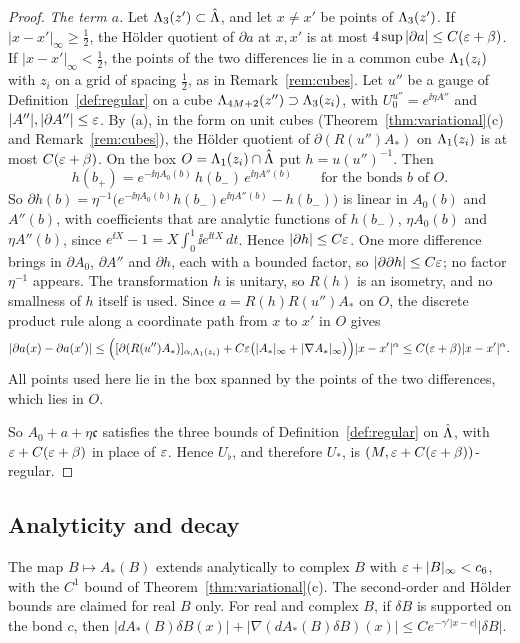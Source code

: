 \begin{proof}
\emph{The term $a$.} Let $\Lambda_3(z')\subset\hat{\Lambda}$, and let $x\ne x'$ be points of $\Lambda_3(z')$. If $|x-x'|_\infty\ge\frac12$, the H\"older quotient of $\partial a$ at $x,x'$ is at most $4\sup|\partial a|\le C(\varepsilon+\beta)$. If $|x-x'|_\infty<\frac12$, the points of the two differences lie in a common cube $\Lambda_1(z_i)$ with $z_i$ on a grid of spacing $\frac12$, as in Remark~\ref{rem:cubes}. Let $u''$ be a gauge of Definition~\ref{def:regular} on a cube $\Lambda_{4M+2}(z'')\supset\Lambda_3(z_i)$, with $U_0^{u''}=e^{\ii\eta A''}$ and $|A''|,|\partial A''|\le\varepsilon$. By (a), in the form on unit cubes (Theorem~\ref{thm:variational}(c) and Remark~\ref{rem:cubes}), the H\"older quotient of $\partial(R(u'')A_*)$ on $\Lambda_1(z_i)$ is at most $C(\varepsilon+\beta)$. On the box $O=\Lambda_1(z_i)\cap\hat{\Lambda}$ put $h=u(u'')^{-1}$. Then
\[
h(b_+)=e^{-\ii\eta A_0(b)}\,h(b_-)\,e^{\ii\eta A''(b)}\qquad\text{for the bonds }b\text{ of }O .
\]
So $\partial h(b)=\eta^{-1}\big(e^{-\ii\eta A_0(b)}h(b_-)e^{\ii\eta A''(b)}-h(b_-)\big)$ is linear in $A_0(b)$ and $A''(b)$, with coefficients that are analytic functions of $h(b_-)$, $\eta A_0(b)$ and $\eta A''(b)$, since $e^{\ii X}-1=X\int_0^1\ii e^{\ii tX}\,dt$. Hence $|\partial h|\le C\varepsilon$. One more difference brings in $\partial A_0$, $\partial A''$ and $\partial h$, each with a bounded factor, so $|\partial\partial h|\le C\varepsilon$; no factor $\eta^{-1}$ appears. The transformation $h$ is unitary, so $R(h)$ is an isometry, and no smallness of $h$ itself is used. Since $a=R(h)R(u'')A_*$ on $O$, the discrete product rule along a coordinate path from $x$ to $x'$ in $O$ gives
\[
|\partial a(x)-\partial a(x')|\le\Big([\partial(R(u'')A_*)]_{\alpha,\Lambda_1(z_i)}+C\varepsilon\big(|A_*|_\infty+|\nabla A_*|_\infty\big)\Big)|x-x'|^\alpha\le C(\varepsilon+\beta)|x-x'|^\alpha .
\]
All points used here lie in the box spanned by the points of the two differences, which lies in $O$.

So $A_0+a+\eta\mathfrak c$ satisfies the three bounds of Definition~\ref{def:regular} on $\hat{\Lambda}$, with $\varepsilon+C(\varepsilon+\beta)$ in place of $\varepsilon$. Hence $U_\flat$, and therefore $U_*$, is $(M,\varepsilon+C(\varepsilon+\beta))$-regular.
\end{proof}

\subsection{Analyticity and decay}\label{ss:27.5}

\begin{proposition}\label{prop:analyticity}
The map $B\mapsto A_*(B)$ extends analytically to complex $B$ with $\varepsilon+|B|_\infty<c_6$, with the $C^1$ bound of Theorem~\ref{thm:variational}(c). The second-order and H\"older bounds are claimed for real $B$ only. For real and complex $B$, if $\delta B$ is supported on the bond $c$, then $|dA_*(B)\delta B(x)|+|\nabla(dA_*(B)\delta B)(x)|\le Ce^{-\gamma'|x-c|}|\delta B|$.
\end{proposition}

